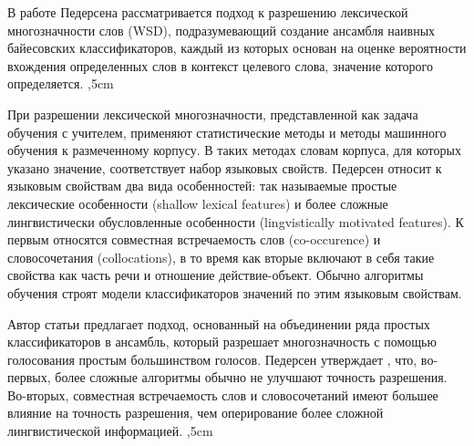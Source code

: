\documentclass{article}
\begin{document}
\begin{articletext}
В работе Педерсена \cite{Pedersen 2000} рассматривается подход к разрешению лексической многозначности слов (WSD), подразумевающий создание ансамбля наивных байесовских классификаторов, каждый из которых основан на оценке вероятности вхождения определенных слов в контекст целевого слова, значение которого определяется.
,5cm

При разрешении лексической многозначности, представленной как задача обучения с учителем, применяют статистические методы и методы машинного обучения к размеченному корпусу. В таких методах словам корпуса, для которых указано значение, соответствует набор языковых свойств. Педерсен \cite{Pedersen 2000} относит к языковым свойствам два вида особенностей: так называемые простые лексические особенности (shallow lexical features) и более сложные лингвистически обусловленные особенности (lingvistically motivated features). К первым относятся совместная встречаемость слов (co-occurence) и словосочетания (collocations), в то время как вторые включают в себя такие свойства как часть речи и отношение действие-объект. Обычно алгоритмы обучения строят модели классификаторов значений по этим языковым свойствам.

Автор статьи \cite{Pedersen 2000} предлагает подход, основанный на объединении ряда простых классификаторов в ансамбль, который разрешает многозначность с помощью голосования простым большинством голосов. Педерсен утверждает \cite{Pedersen 2000}, что, во-первых, более сложные алгоритмы обычно не улучшают точность разрешения. Во-вторых, совместная встречаемость слов и словосочетаний имеют большее влияние на точность разрешения, чем оперирование более сложной лингвистической информацией.
,5cm



\end{articletext}
\end{document}
